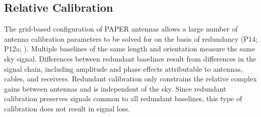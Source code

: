 \documentclass[twocolumn,numberedappendix]{emulateapj} \shorttitle{PSA64}
\begin{document}
\subsection{Relative Calibration}\label{sec:relcal}
%         
%

The grid-based configuration of PAPER antennas allows a large number of antenna
calibration parameters to be solved for on the basis of redundancy (P14; P12a;
\citealt{zheng_et_al2014}).  Multiple baselines of the same length and
orientation measure the same sky signal. Differences between redundant
baselines result from differences in the signal chain, including amplitude and
phase effects attributable to antennas, cables, and receivers.  Redundant
calibration only constrains the relative complex gains between antennas and is
independent of the sky. Since redundant calibration preserves signals common to
all redundant baselines, this type of calibration does not result in signal loss.
\end{document}
